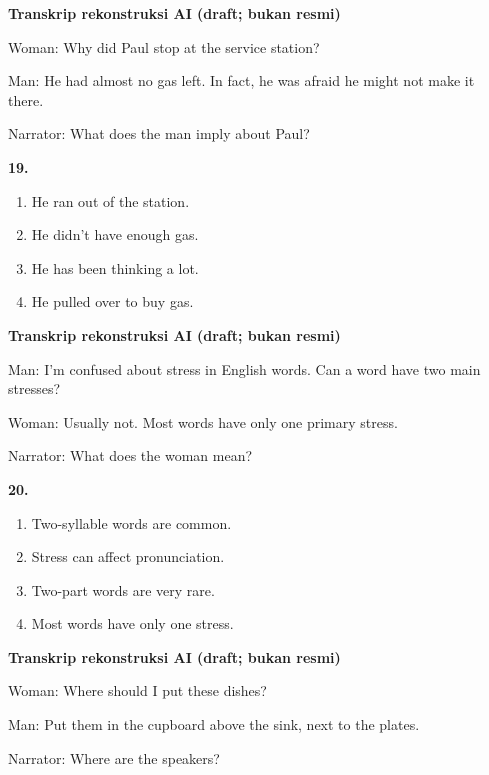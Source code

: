 \documentclass[12pt]{article}
\begin{document}
\par
\vspace{0.25\baselineskip}
\begin{exampleblock}
\textbf{Transkrip rekonstruksi AI (draft; bukan resmi)}\par
Woman: Why did Paul stop at the service station?\par
Man: He had almost no gas left. In fact, he was afraid he might not make it there.\par
Narrator: What does the man imply about Paul?\par
\end{exampleblock}
\noindent\textbf{19.}
\begin{enumerate}[label=(\Alph*),leftmargin=*,itemsep=0.2em]
\item He ran out of the station.
\item He didn't have enough gas.
\item He has been thinking a lot.
\item He pulled over to buy gas.
\end{enumerate}
\par
\vspace{0.25\baselineskip}
\begin{exampleblock}
\textbf{Transkrip rekonstruksi AI (draft; bukan resmi)}\par
Man: I'm confused about stress in English words. Can a word have two main stresses?\par
Woman: Usually not. Most words have only one primary stress.\par
Narrator: What does the woman mean?\par
\end{exampleblock}
\noindent\textbf{20.}
\begin{enumerate}[label=(\Alph*),leftmargin=*,itemsep=0.2em]
\item Two-syllable words are common.
\item Stress can affect pronunciation.
\item Two-part words are very rare.
\item Most words have only one stress.
\end{enumerate}
\par
\vspace{0.25\baselineskip}
\begin{exampleblock}
\textbf{Transkrip rekonstruksi AI (draft; bukan resmi)}\par
Woman: Where should I put these dishes?\par
Man: Put them in the cupboard above the sink, next to the plates.\par
Narrator: Where are the speakers?\par
\end{exampleblock}
\end{document}
